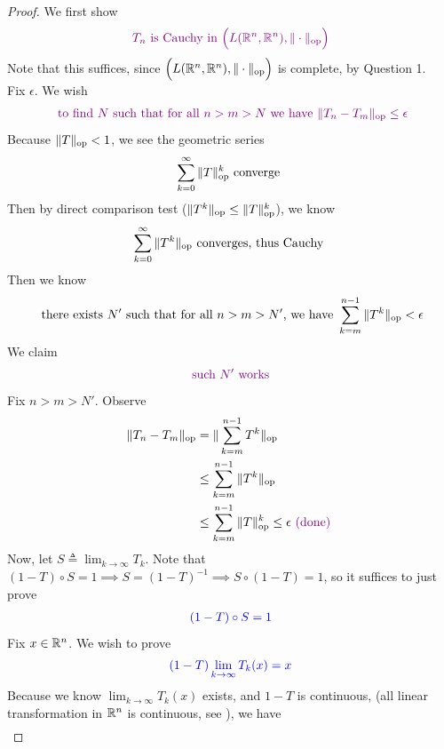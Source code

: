\documentclass{report}
\begin{document}
\begin{proof}
We first show 
\begin{align*}
\textcolor{violet}{T_n\text{ is Cauchy in }\Big(L(\mathbb{R}^n,\mathbb{R}^n),\| \cdot \|_\text{op} \Big)}
\end{align*}
Note that this suffices, since $\Big(L(\mathbb{R}^n,\mathbb{R}^n), \| \cdot \|_\text{op} \Big)$ is complete, by Question 1.\\

Fix $\epsilon $. We wish 
\begin{align*}
\textcolor{violet}{\text{ to find }N\text{ such that for all $n>m>N$ we have }\| T_n-T_m \|_\text{op}\leq \epsilon }
\end{align*}
Because $\| T \|_{\text{op}}<1$, we see the geometric series 
\begin{align*}
  \sum_{k=0}^{\infty} \| T \|_{\text{op}}^k\text{ converge }
\end{align*}
Then by direct comparison test ($\| T^k \|_\text{op}\leq \| T \|_\text{op}^k$), we know 
\begin{align*}
\sum_{k=0}^{\infty} \| T^k \|_{\text{op}}\text{ converges, thus Cauchy }
\end{align*}
Then we know 
\begin{align*}
\text{ there exists $N'$ such that for all  $n>m>N'$, we have }\sum_{k=m}^{n-1} \| T^{k} \|_\text{op}<\epsilon 
\end{align*}
We claim 
\begin{align*}
\textcolor{violet}{\text{ such $N'$ works }}
\end{align*}
Fix $n>m>N'$. Observe 
 \begin{align*}
\| T_n-T_m \|_\text{op}&=\| \sum_{k=m}^{n-1}T^k \|_\text{op}\\
&\leq \sum_{k=m}^{n-1} \| T^k \|_\text{op}\\
&\leq \sum_{k=m}^{n-1} \| T \|_{\text{op}}^k \leq \epsilon  \textcolor{violet}{\text{ (done) }}
\end{align*}
Now, let $S\triangleq \lim_{k\to \infty}T_k$. Note that $(1-T)\circ S=1 \implies S=(1-T)^{-1}\implies S\circ (1-T)=1$, so it suffices to just prove 
\begin{align*}
\textcolor{blue}{(1-T)\circ S=1}
\end{align*}
Fix $x \in\mathbb{R}^n$. We wish to prove 
\begin{align*}
  \textcolor{blue}{(1-T)\lim_{k\to \infty}T_k(x)=x}
\end{align*}
Because we know $\lim_{k\to \infty}T_k(x)$ exists, and $1-T$ is continuous,  (all linear transformation in $\mathbb{R}^n$ is continuous, see ), we have
\begin{align*}

\end{align*}
\end{proof}
\end{document}
